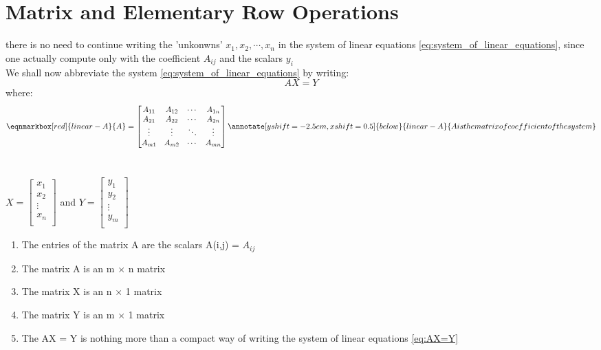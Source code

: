 \section{Matrix and Elementary Row Operations}
there is no need to continue writing the 'unkonwns' $x_1,x_2,\cdots,x_n$ in the system of linear equations \ref{eq:system_of_linear_equations},
since one actually compute only with the coefficient $A_{ij}$ and the scalars  $y_i$\\
We shall now abbreviate the system \ref{eq:system_of_linear_equations} by writing:
\[
	AX=Y
	\label{eq:AX=Y}
\]
where:
\begin{equation}
	\eqnmarkbox[red]{linear-A}{A} = \begin{bmatrix}
		A_{11} & A_{12} & \cdots & A_{1n} \\
		A_{21} & A_{22} & \cdots & A_{2n} \\
		\vdots & \vdots & \ddots & \vdots \\
		A_{m1} & A_{m2} & \cdots & A_{mn} \\
	\end{bmatrix}
	\annotate[yshift=-2.5em,xshift=0.5]{below}{linear-A}{A is the matrix of coefficient of the system}
	\label{eq:A equals}
\end{equation}
\\
\begin{center}


	$
		X = \begin{bmatrix}
			x_1    \\
			x_2    \\
			\vdots \\
			x_n    \\
		\end{bmatrix}
	$ \quad and \quad $
		Y = \begin{bmatrix}
			y_1    \\
			y_2    \\
			\vdots \\
			y_m    \\
		\end{bmatrix}
	$
\end{center}
\newpage
\begin{remark}
	\begin{enumerate}
		\item The entries of the matrix A are the scalars A(i,j) = $A_{ij}$
		\item The matrix A is an m $\times$ n matrix
		\item The matrix X is an n $\times$ 1 matrix
		\item The matrix Y is an m $\times$ 1 matrix
		\item The AX = Y is nothing more than a compact way of writing the system of linear equations
		      \ref{eq:AX=Y}
	\end{enumerate}
\end{remark}
